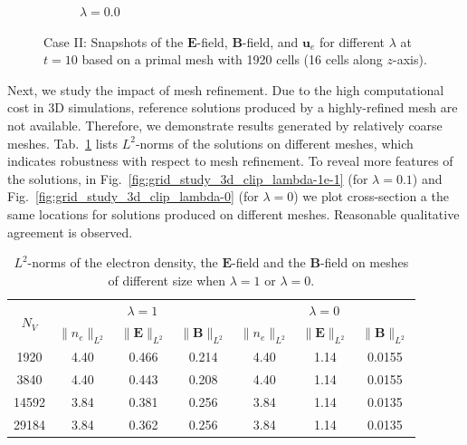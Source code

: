 \documentclass{article}
\begin{document}
\begin{figure}
\begin{subfigure}[b]{\textwidth}
        \caption{\colorbox{yellow!30}{$\lambda = 0.0$}}
    \end{subfigure}
    \caption{Case II: Snapshots of the $\mathbf{E}$-field, $\mathbf{B}$-field, and $\mathbf{u}_e$ for different $\lambda$ at $t = 10$ based on a primal mesh with 1920 cells (16 cells along $z$-axis). } 
    \label{fig:3d_vec_field_E_B_ue}
\end{figure}

Next, we study the impact of mesh refinement. Due to the high computational cost in 3D
simulations, reference solutions produced by a highly-refined mesh are not
available. Therefore, we demonstrate results generated by relatively coarse
meshes. Tab.~\ref{tab:grid_study_norm} lists $L^2$-norms of the solutions on different
meshes, which indicates robustness with respect to mesh refinement. To reveal more
features of the solutions, in Fig.~\ref{fig:grid_study_3d_clip_lambda-1e-1} (for
$\lambda = 0.1$) and Fig.~\ref{fig:grid_study_3d_clip_lambda-0} (for $\lambda = 0$) we plot
cross-section a the same locations for solutions produced on different meshes. Reasonable
qualitative agreement is observed. 

\begin{table}[]
    \centering
    \begin{tabular}{c | c c c | c c c}
        \hline\hline
        \multirow{2}{1em}{$N_V$} & \multicolumn{3}{c|}{\colorbox{yellow!30}{$\lambda = 1$}}
        &
        \multicolumn{3}{c}{\colorbox{yellow!30}{$\lambda = 0$}} \\
        \cline{2-4} \cline{5-7}
        & $\|n_e \|_{L^2}$ & $\|\mathbf{E} \|_{L^2}$ & $\|\mathbf{B} \|_{L^2}$ & $\|n_e
        \|_{L^2}$
        & $\|\mathbf{E} \|_{L^2}$ & $\|\mathbf{B} \|_{L^2}$  \\
        \hline
         1920  &  4.40 & 0.466 & 0.214 & 4.40 & 1.14 & 0.0155 \\
         3840  &  4.40 & 0.443 & 0.208 & 4.40 & 1.14 & 0.0155 \\
         14592 &  3.84 & 0.381 & 0.256 & 3.84 & 1.14 & 0.0135 \\ 
         29184 &  3.84 & 0.362 & 0.256 & 3.84 & 1.14 & 0.0135 \\
         \hline\hline
    \end{tabular}
    \caption{$L^2$-norms of the electron density, the $\mathbf{E}$-field and the
      $\mathbf{B}$-field on meshes of different size when
      \colorbox{yellow!30}{$\lambda = 1$} or \colorbox{yellow!30}{$\lambda = 0$}.}
    \label{tab:grid_study_norm}
\end{table}
\end{document}
